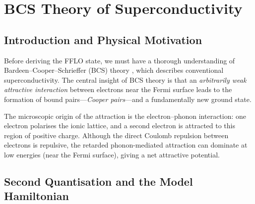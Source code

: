 
\section{BCS Theory of Superconductivity}

\subsection{Introduction and Physical Motivation}

Before deriving the FFLO state, we must have a thorough understanding of
Bardeen--Cooper--Schrieffer (BCS) theory \cite{BCS1957}, which describes
conventional superconductivity. The central insight of BCS theory is that
an \emph{arbitrarily weak attractive interaction} between electrons near the
Fermi surface leads to the formation of bound pairs---\emph{Cooper pairs}---and
a fundamentally new ground state.

The microscopic origin of the attraction is the electron--phonon interaction:
one electron polarises the ionic lattice, and a second electron is attracted
to this region of positive charge. Although the direct Coulomb repulsion
between electrons is repulsive, the retarded phonon-mediated attraction can
dominate at low energies (near the Fermi surface), giving a net attractive
potential.

\subsection{Second Quantisation and the Model Hamiltonian}

